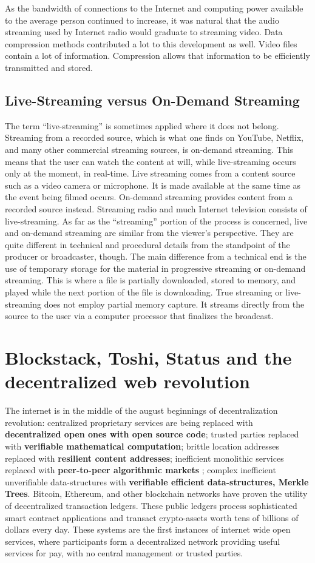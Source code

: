 \documentclass{article}
\begin{document}
As the bandwidth of connections to the Internet and computing power available to the average person continued to increase, it was natural that the audio streaming used by Internet radio would graduate to streaming video. Data compression methods contributed a lot to this development as well. Video files contain a lot of information. Compression allows that information to be efficiently transmitted and stored.

\subsection{Live-Streaming versus On-Demand Streaming}
The term “live-streaming” is sometimes applied where it does not belong. Streaming from a recorded source, which is what one finds on YouTube, Netflix, and many other commercial streaming sources, is on-demand streaming. This means that the user can watch the content at will, while live-streaming occurs only at the moment, in real-time. Live streaming comes from a content source such as a video camera or microphone. It is made available at the same time as the event being filmed occurs. On-demand streaming provides content from a recorded source instead. Streaming radio and much Internet television consists of live-streaming.
As far as the “streaming” portion of the process is concerned, live and on-demand streaming are similar from the viewer’s perspective. They are quite different in technical and procedural details from the standpoint of the producer or broadcaster, though. The main difference from a technical end is the use of temporary storage for the material in progressive streaming or on-demand streaming. This is where a file is partially downloaded, stored to memory, and played while the next portion of the file is downloading. True streaming or live-streaming does not employ partial memory capture. It streams directly from the source to the user via a computer processor that finalizes the broadcast.

\section{Blockstack, Toshi, Status and the decentralized web revolution}
 The internet is in the middle of the august beginnings of decentralization revolution: centralized proprietary services are being replaced with \textbf{decentralized open ones with open source code}; trusted parties replaced with \textbf{verifiable mathematical computation}; brittle location addresses replaced with \textbf{resilient content addresses}; inefficient monolithic services replaced with \textbf{peer-to-peer algorithmic markets} ; complex inefficient unverifiable data-structures with \textbf{verifiable efficient data-structures, Merkle Trees}. Bitcoin, Ethereum, and other blockchain networks have proven the utility of decentralized transaction ledgers. These public ledgers process sophisticated smart contract applications and transact crypto-assets worth tens of billions of dollars every day. These systems are the first instances of internet wide open services, where participants form a decentralized network providing useful services for pay, with no central management or trusted parties.
 
\end{document}
